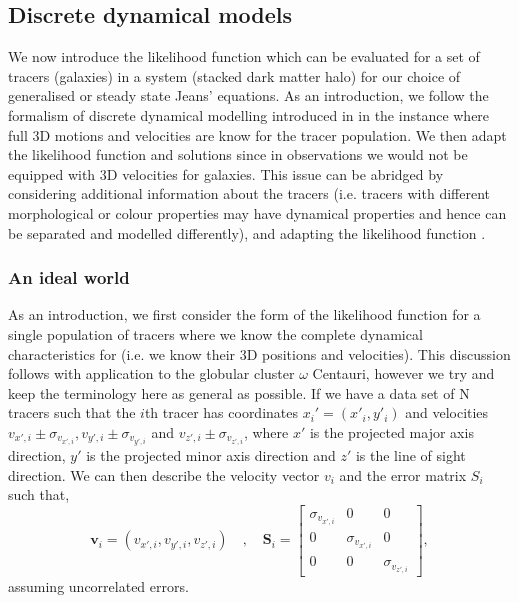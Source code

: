 \subsection{Discrete dynamical models} \label{sec:discrete_dynamical_models}
We now introduce the likelihood function which can be evaluated for a set of tracers (galaxies) in a system (stacked dark matter halo) for our choice of generalised or steady state Jeans' equations. As an introduction, we follow the formalism of discrete dynamical modelling introduced in \citet{watkins2013} in the instance where full 3D motions and velocities are know for the tracer population. We then adapt the likelihood function and solutions since in observations we would not be equipped with 3D velocities for galaxies. This issue can be abridged by considering additional information about the tracers (i.e. tracers with different morphological or colour properties may have dynamical properties and hence can be separated and modelled differently), and adapting the likelihood function \citep[e.g.][]{zhu16sculptor}.

\subsubsection{An ideal world}
As an introduction, we first consider the form of the likelihood function for a single population of tracers where we know the complete dynamical characteristics for (i.e. we know their 3D positions and velocities). This discussion follows \citet{watkins2013} with application to the globular cluster $\omega$ Centauri, however we try and keep the terminology here as general as possible. If we have a data set of N tracers such that the $i$th tracer has coordinates $x_{i}'= (x'_{i},y'_{i})$ and velocities $v_{x',i} \pm \sigma_{v_{x',i}}, v_{y',i} \pm \sigma_{v_{y',i}}$ and $v_{z',i} \pm \sigma_{v_{z',i}}$, where $x'$ is the projected major axis direction, $y'$ is the projected minor axis direction and $z'$ is the line of sight direction. We can then describe the velocity vector \textbf{$v_{i}$} and the error matrix \textbf{$S_{i}$} such that,
\begin{equation}
\boldsymbol{v}_{i} = (v_{x',i},v_{y',i},v_{z',i}) \quad , \quad \boldsymbol{S}_{i} = \begin{bmatrix} \sigma_{v_{x',i}} & 0 & 0 \\ 0 & \sigma_{v_{x',i}} & 0 \\ 0 & 0 & \sigma_{v_{z',i}} \end{bmatrix},
\end{equation}
assuming uncorrelated errors.

